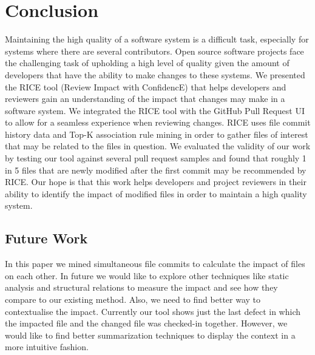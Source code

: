 
\section{Conclusion}
\label{sec:conclusion}

Maintaining the high quality of a software system is a difficult task, especially for systems where there are several contributors. Open source software projects face the challenging task of upholding a high level of quality given the amount of developers that have the ability to make changes to these systems. We presented the RICE tool (Review Impact with ConfidencE) that helps developers and reviewers gain an understanding of the impact that changes may make in a software system. We integrated the RICE tool with the GitHub Pull Request UI to allow for a seamless experience when reviewing changes. RICE uses file commit history data and Top-K association rule mining in order to gather files of interest that may be related to the files in question. We evaluated the validity of our work by testing our tool against several pull request samples and found that roughly 1 in 5 files that are newly modified after the first commit may be recommended by RICE. Our hope is that this work helps developers and project reviewers in their ability to identify the impact of modified files in order to maintain a high quality system.\\
\subsection{Future Work}
In this paper we mined simultaneous file commits to calculate the impact of files on each other. In future we would like to explore other techniques like static analysis and structural relations to measure the impact and see how they compare to our existing method. Also, we need to find better way to contextualise the impact. Currently our tool shows just the last defect in which the impacted file and the changed file was checked-in together. However, we would like to find better summarization techniques to display the context in a more intuitive fashion.

